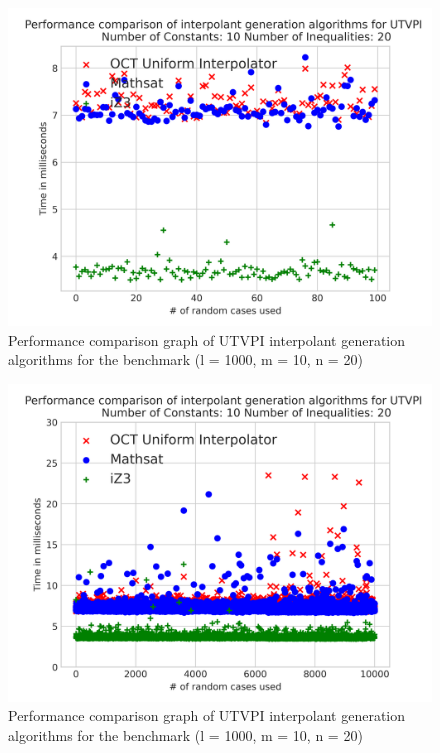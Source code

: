 \begin{figure}
  \centering
  \includegraphics[scale=0.6]{figures/octi_performance_graph_10_20_100.png}
  \caption{Performance comparison graph of UTVPI interpolant generation
  algorithms for the benchmark (l = 1000, m = 10, n = 20)} 

  \label{performance_graph_oct_3}
\end{figure}

\begin{figure}
  \centering
  \includegraphics[scale=0.6]{figures/octi_performance_graph_10_20_10000.png}
  \caption{Performance comparison graph of UTVPI interpolant generation
  algorithms for the benchmark (l = 1000, m = 10, n = 20)} 

  \label{performance_graph_oct_4}
\end{figure}

